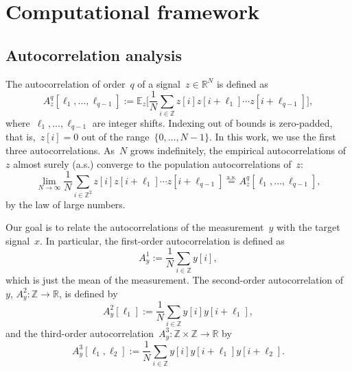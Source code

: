 \documentclass{article}
\begin{document}
\section{Computational framework}
\label{sec:math}
\subsection{Autocorrelation analysis}
\label{subsec:ac}
The autocorrelation of order~$q$ of a signal~\mbox{$z \in \mathbb{R}^{N}$} is defined as
\begin{equation}
A_z^q[\ell_1, \ldots, \ell_{q-1}] := \mathbb{E}_z\Big[\frac{1}{N} \sum_{i \in \mathbb{Z}} z[i] z[i + \ell_1] \cdots z[i + \ell_{q-1}]\Big],
\end{equation}
where~$\ell_1, \ldots, \ell_{q-1}$ are integer shifts. Indexing out of bounds is zero-padded, that is,~\mbox{$z[i] = 0$} out of the range~\mbox{$\{0, \ldots, {N-1}\}$}. In this work, we use the first three autocorrelations. As~$N$ grows indefinitely, the empirical autocorrelations of~$z$ almost surely (a.s.) converge to the population autocorrelations of~$z$:
\begin{equation}
\lim_{N \rightarrow \infty} \frac{1}{N} \sum_{i \in \mathbb{Z}^2} z[i] z[i + \ell_1] \cdots z[i + \ell_{q-1}] \stackrel{\text{a.s.}}{=}A_z^q[\ell_1, \ldots, \ell_{q-1}],
\end{equation}
by the law of large numbers.

Our goal is to relate the autocorrelations of the measurement~$y$ with the target signal~$x$. In particular, the first-order autocorrelation is defined as
\begin{equation*}
A_{y}^1 := \frac{1}{N} \sum_{i \in \mathbb{Z}} y[i],
\end{equation*}
which is just the mean of the measurement. The second-order autocorrelation of~$y$, \mbox{$A_{y}^2: \mathbb{Z} \rightarrow \mathbb{R}$}, is defined by
\begin{equation*}
A_{y}^2 [\ell_1] := \frac{1}{N} \sum_{i \in \mathbb{Z}} y[i] y[i + \ell_1],
\end{equation*}
and the third-order autocorrelation~\mbox{$A_{y}^3: \mathbb{Z} \times \mathbb{Z} \rightarrow \mathbb{R}$} by
\begin{equation*}
A_{y}^3 [\ell_1, \ell_2] := \frac{1}{N} \sum_{i \in \mathbb{Z}} y[i] y[i + \ell_1] y[i + \ell_2].
\end{equation*}
\end{document}
